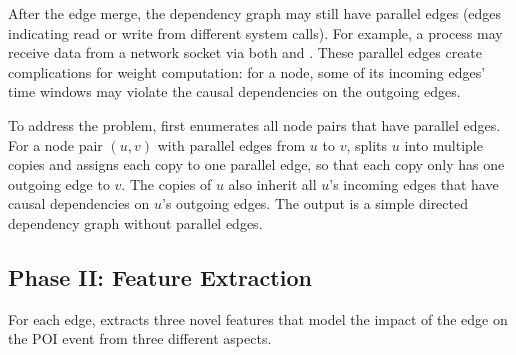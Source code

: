 After the edge merge, the dependency graph may still have parallel edges (\ie edges indicating read or write from different system calls).
For example, a process may receive data from a network socket via both  and .
These parallel edges create complications for weight computation: for a node, some of its incoming edges' time windows may violate the causal dependencies on the outgoing edges.

To address the problem, 
\tool first enumerates all node pairs that have parallel edges.
For a node pair $(u,v)$ 
with parallel edges from $u$ to $v$,
\tool splits $u$ into multiple copies and assigns each copy to one parallel edge, so that each copy 
only has one outgoing edge to $v$. The copies of $u$ also inherit all $u$'s incoming edges that have causal dependencies on $u$'s outgoing edges.
The output 
is a simple directed dependency graph without parallel edges.



\subsection{Phase II: Feature Extraction}
\label{subsec:feature-extraction}
For each edge, \tool extracts three novel 
features that 
model the impact of the edge on the POI event from three different aspects.


